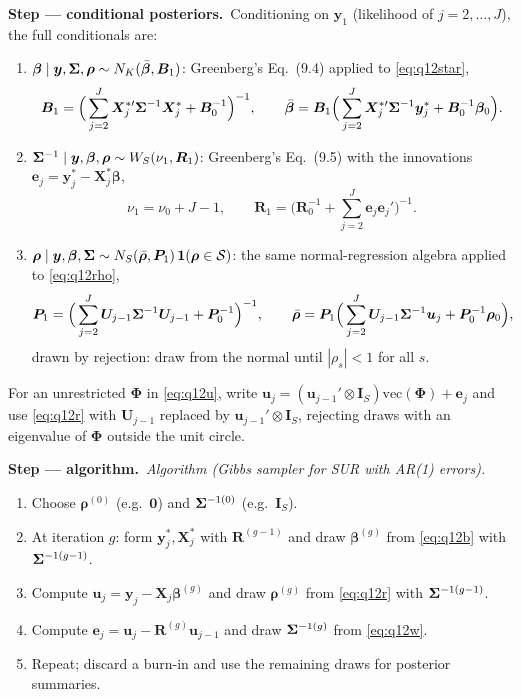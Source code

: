\documentclass[11pt,a4paper]{article}
\newcommand{\passo}[2]{\par\smallskip\noindent\textbf{Step --- #1.}~#2}
\begin{document}
\begin{sol}
\passo{conditional posteriors}{Conditioning on $\bm y_1$ (likelihood of $j=2,\dots,J$), the full conditionals are:
\begin{enumerate}[label=(\alph*),leftmargin=2em]
\item $\bm\beta\mid\bm y,\bm{\Sigma},\bm\rho\sim N_K(\bar{\bm\beta},\bm B_1)$: Greenberg's Eq.~(9.4) applied to \eqref{eq:q12star},
\begin{equation}
\bm B_1=\Big(\sum_{j=2}^J\bm X_j^{*\prime}\bm{\Sigma}^{-1}\bm X_j^*+\bm B_0^{-1}\Big)^{-1},\qquad
\bar{\bm\beta}=\bm B_1\Big(\sum_{j=2}^J\bm X_j^{*\prime}\bm{\Sigma}^{-1}\bm y_j^*+\bm B_0^{-1}\bm\beta_0\Big).\label{eq:q12b}
\end{equation}
\item $\bm{\Sigma}^{-1}\mid\bm y,\bm\beta,\bm\rho\sim W_S(\nu_1,\bm R_1)$: Greenberg's Eq.~(9.5) with the innovations
$\bm e_j=\bm y_j^*-\bm X_j^*\bm\beta$,
\begin{equation}
\nu_1=\nu_0+J-1,\qquad \bm R_1=\Big(\bm R_0^{-1}+\sum_{j=2}^J\bm e_j\bm e_j'\Big)^{-1}.\label{eq:q12w}
\end{equation}
\item $\bm\rho\mid\bm y,\bm\beta,\bm{\Sigma}\sim N_S(\bar{\bm\rho},\bm P_1)\,\mathbf 1(\bm\rho\in\mathcal S)$: the same
normal-regression algebra applied to \eqref{eq:q12rho},
\begin{equation}
\bm P_1=\Big(\sum_{j=2}^J\bm U_{j-1}\bm{\Sigma}^{-1}\bm U_{j-1}+\bm P_0^{-1}\Big)^{-1},\qquad
\bar{\bm\rho}=\bm P_1\Big(\sum_{j=2}^J\bm U_{j-1}\bm{\Sigma}^{-1}\bm u_j+\bm P_0^{-1}\bm\rho_0\Big),\label{eq:q12r}
\end{equation}
drawn by rejection: draw from the normal until $|\rho_s|<1$ for all $s$.
\end{enumerate}
For an unrestricted $\bm\Phi$ in \eqref{eq:q12u}, write $\bm u_j=(\bm u_{j-1}'\otimes\bm I_S)\mathrm{vec}(\bm\Phi)+\bm e_j$
and use \eqref{eq:q12r} with $\bm U_{j-1}$ replaced by $\bm u_{j-1}'\otimes\bm I_S$, rejecting draws with an
eigenvalue of $\bm\Phi$ outside the unit circle.}

\passo{algorithm}{\textit{Algorithm (Gibbs sampler for SUR with AR(1) errors).}
\begin{enumerate}[label=\arabic*.,leftmargin=2em]
\item Choose $\bm\rho^{(0)}$ (e.g.\ $\bm0$) and $\bm{\Sigma}^{-1(0)}$ (e.g.\ $\bm I_S$).
\item At iteration $g$: form $\bm y_j^*,\bm X_j^*$ with $\bm R^{(g-1)}$ and draw $\bm\beta^{(g)}$ from \eqref{eq:q12b}
with $\bm{\Sigma}^{-1(g-1)}$.
\item Compute $\bm u_j=\bm y_j-\bm X_j\bm\beta^{(g)}$ and draw $\bm\rho^{(g)}$ from \eqref{eq:q12r} with $\bm{\Sigma}^{-1(g-1)}$.
\item Compute $\bm e_j=\bm u_j-\bm R^{(g)}\bm u_{j-1}$ and draw $\bm{\Sigma}^{-1(g)}$ from \eqref{eq:q12w}.
\item Repeat; discard a burn-in and use the remaining draws for posterior summaries.
\end{enumerate}}


\end{sol}
\end{document}
